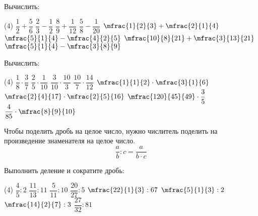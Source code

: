 %
%
%
%
%
%
\begin{class}[number=2]
	\begin{listofex}
		\item Вычислить:
		\begin{tasks}(4)
			\task \( \dfrac{1}{2}+\dfrac{5}{6} \)
			\task \( \dfrac{2}{3}-\dfrac{1}{2} \)
			\task \( \dfrac{8}{9}+\dfrac{1}{12} \)
			\task \( \dfrac{5}{8}-\dfrac{1}{20} \)
			\task \( \mfrac{1}{2}{3}+\mfrac{2}{1}{4} \)
			\task \( \mfrac{5}{1}{4}-\mfrac{4}{2}{5} \)
			\task \( \mfrac{10}{8}{21}+\mfrac{3}{13}{21} \)
			\task \( \mfrac{5}{1}{4}-\mfrac{3}{8}{9} \)
		\end{tasks}
		\item Вычислить:
		\begin{tasks}(4)
			\task \( \dfrac{1}{8}\cdot\dfrac{3}{7} \)
			\task \( \dfrac{2}{5}\cdot\dfrac{1}{10} \)
			\task \( \dfrac{3}{10}\cdot\dfrac{10}{3} \)
			\task \( \dfrac{10}{7}\cdot\dfrac{14}{12} \)
			\task \( \mfrac{1}{1}{2}\cdot\mfrac{3}{1}{6} \)
			\task \( \mfrac{2}{4}{17}\cdot\mfrac{2}{5}{16} \)
			\task \( \mfrac{120}{45}{49}\cdot\dfrac{3}{5} \)
			\task \( \dfrac{4}{85}\cdot\mfrac{8}{9}{10} \)
			\end{tasks}
		\end{listofex}
		\begin{definit}
			Чтобы поделить дробь на целое число, нужно числитель поделить на произведение знаменателя на целое число.
			\[ \dfrac{a}{b}:c=\dfrac{a}{b\cdot c} \]
		\end{definit}
	\begin{listofex}[resume]
		\item Выполнить деление и сократите дробь:
		\begin{tasks}(4)
			\task \( \dfrac{4}{5}:2 \)
			\task \( \dfrac{11}{13}:11 \)
			\task \( \dfrac{5}{11}:10 \)
			\task \( \dfrac{20}{27}:5 \)
			\task \( \mfrac{22}{1}{3}:67 \)
			\task \( \mfrac{5}{1}{3}:2 \)
			\task \( \mfrac{14}{2}{7}:3 \)
			\task \( \dfrac{27}{32}:81 \)
		\end{tasks}
	\end{listofex}
		\begin{definit}

\end{definit}
\end{class}

